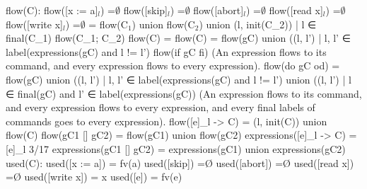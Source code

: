flow(C):\newline
flow([x := a]$_l$)        =$\emptyset$\newline
flow([skip]$_l$)          =$\emptyset$\newline
flow([abort]$_l$)         =$\emptyset$\newline
flow([read x]$_l$)        =$\emptyset$\newline
flow([write x]$_l$)       =$\emptyset$\newline
                        = flow(C$_1$) union flow(C$_2$) union { (l, init(C_2)) | l ∈ final(C_1) }
flow(C_1; C_2)
flow({C})               = flow(C)
                        = flow(gC) union { ((l, l') | l, l' ∈ label(expressions(gC) and l != l') }
flow(if gC fi)
         (An expression flows to its command,
         and every expression flows to every expression).
flow(do gC od)          = flow(gC) union
                          { ((l, l') | l, l' ∈ label(expressions(gC) and l != l') } union
                          { ((l, l') | l ∈ final(gC) and l' ∈ label(expressions(gC)) }
         (An expression flows to its command,
         and every expression flows to every expression,
         and every final labels of commands goes to every expression).
flow([e]_l -> C)        = {(l, init(C))} union flow(C)
flow(gC1 [] gC2)        = flow(gC1) union flow(gC2)
expressions([e]_l -> C)          = {[e]_l}
                                                                                                   3/17
expressions(gC1 [] gC2)      = expressions(gC1) union expressions(gC2)
used(C):
used([x := a])       = fv(a)
used([skip])         =Ø
used([abort])        =Ø
used([read x])       =Ø
used([write x])      = {x}
used([e])            = fv(e)

